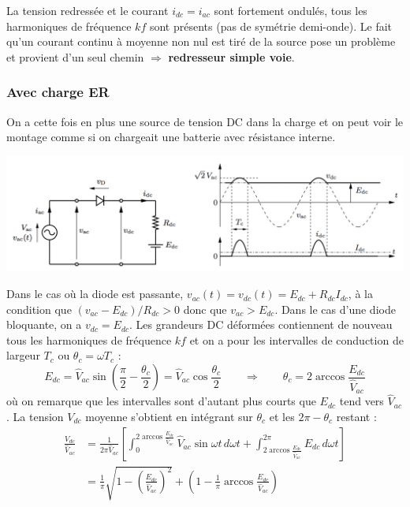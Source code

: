 				La tension redressée et le courant $i_{dc}=i_{ac}$ sont fortement ondulés, tous les harmoniques de fréquence $kf$ sont présents (pas de symétrie demi-onde). Le fait qu'un courant continu à moyenne non nul est tiré de la source pose un problème et provient d'un seul chemin $\Rightarrow$ \textbf{redresseur simple voie}. 
				
			\subsubsection{Avec charge ER}
				On a cette fois en plus une source de tension DC dans la charge et on peut voir le montage comme si on chargeait une batterie avec résistance interne. 
				
				\begin{center}
				\includegraphics[scale=0.45]{ch2/4}
				\end{center}			 
				
				Dans le cas où la diode est passante, $v_{ac}(t) = v_{dc}(t) = E_{dc} + R_{dc}I_{dc}$, à la condition que $(v_{ac}-E_{dc})/R_{dc}>0$ donc que $v_{ac}>E_{dc}$. Dans le cas d'une diode bloquante, on a $v_{dc} = E_{dc}$. Les grandeurs DC déformées contiennent de nouveau tous les harmoniques de fréquence $kf$ et on a pour les intervalles de conduction de largeur $T_c$ ou $\theta _c = \omega T_c$ : 
				\begin{equation}
					E_{dc} = \hat{V}_{ac} \sin \left(\frac{\pi}{2} - \frac{\theta _c}{2}\right) = \hat{V}_{ac} \cos \frac{\theta _c}{2} \qquad \Rightarrow \qquad \theta _c = 2 \arccos \frac{E_{dc}}{\hat{V}_{ac}}
				\end{equation}
				où on remarque que les intervalles sont d'autant plus courts que $E_{dc}$ tend vers $\hat{V}_{ac}$. La tension $V_{dc}$ moyenne s'obtient en intégrant sur $\theta _c$ et les $2\pi - \theta _c$ restant : 
				\begin{equation}
				\begin{aligned}
					\frac{V_{dc}}{\hat{V}_{ac}} &= \frac{1}{2\pi\hat{V}_{ac}} \left[ \int _0 ^{2 \arccos \frac{E_{dc}}{\hat{V}_{ac}}} \hat{V}_{ac} \sin \omega t\,  d\omega t + \int _{2 \arccos \frac{E_{dc}}{\hat{V}_{ac}}} ^{2\pi} E_{dc} \, d\omega t \right]\\
								&= \frac{1}{\pi} \sqrt{1 - \left(\frac{E_{dc}}{\hat{V}_{ac}}\right)^2} + \left(1- \frac{1}{\pi} \arccos \frac{E_{dc}}{\hat{V}_{ac}} \right)
				\end{aligned}
				\end{equation}
				
